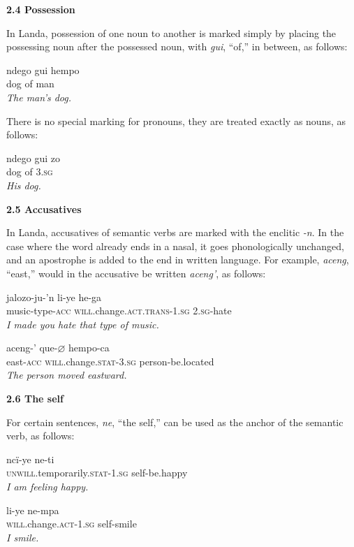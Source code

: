 \documentclass{article}[10pt]
\begin{document}
{\bf 2.4 Possession}

In Landa, possession of one noun to another is marked simply by placing the possessing noun after the possessed noun, with \emph{gui}, ``of,'' in between, as follows:

\begin{exe}
\ex
\gll ndego gui hempo\\
dog of man\\
\trans \emph{The man's dog.}
\end{exe}

There is no special marking for pronouns, they are treated exactly as nouns, as follows:

\begin{exe}
\ex
\gll ndego gui zo\\
dog of 3.\textsc{sg}\\
\trans \emph{His dog.}
\end{exe}

{\bf 2.5 Accusatives}

In Landa, accusatives of semantic verbs are marked with the enclitic \emph{-n}. In the case where the word already ends in a nasal, it goes phonologically unchanged, and an apostrophe is added to the end in written language. For example, \emph{aceng}, ``east,'' would in the accusative be written \emph{aceng'}, as follows:
\begin{exe}
\ex
\gll jalozo-ju-'n li-ye he-ga\\
music-type-\textsc{acc} \textsc{will}.change.\textsc{act}.\textsc{trans}-1.\textsc{sg} 2.\textsc{sg}-hate\\
\trans \emph{I made you hate that type of music.}

\ex
\gll aceng-' que-$\varnothing$ hempo-ca\\
east-\textsc{acc} \textsc{will}.change.\textsc{stat}-3.\textsc{sg} person-be.located\\
\trans \emph{The person moved eastward.}
\end{exe}

{\bf 2.6 The self}

For certain sentences, \emph{ne}, ``the self,'' can be used as the anchor of the semantic verb, as follows:
\begin{exe}
\ex
\gll nc\"{i}-ye ne-ti\\
\textsc{unwill}.temporarily.\textsc{stat}-1.\textsc{sg} self-be.happy\\
\trans \emph{I am feeling happy.}

\ex
\gll li-ye ne-mpa\\
\textsc{will}.change.\textsc{act}-1.\textsc{sg} self-smile\\
\trans \emph{I smile.}
\end{exe}
\end{document}
